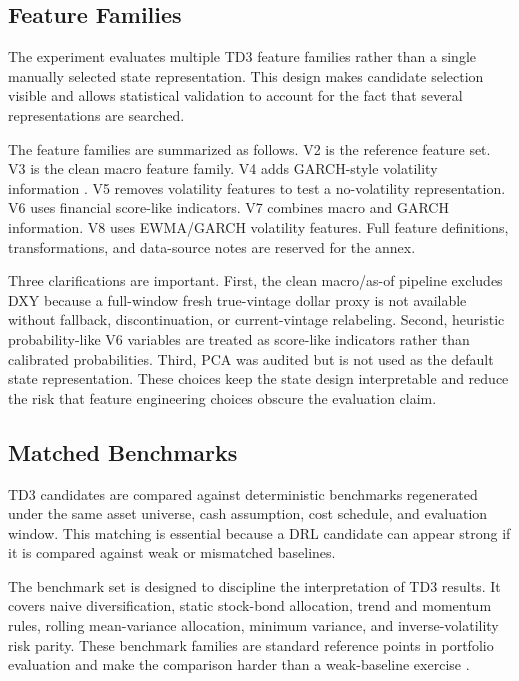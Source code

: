 \documentclass[12pt]{article}
\begin{document}
\subsection{Feature Families}

The experiment evaluates multiple TD3 feature families rather than a single manually selected state representation. This design makes candidate selection visible and allows statistical validation to account for the fact that several representations are searched.

The feature families are summarized as follows. V2 is the reference feature set. V3 is the clean macro feature family. V4 adds GARCH-style volatility information \citep{bollerslev1986}. V5 removes volatility features to test a no-volatility representation. V6 uses financial score-like indicators. V7 combines macro and GARCH information. V8 uses EWMA/GARCH volatility features. Full feature definitions, transformations, and data-source notes are reserved for the annex.

Three clarifications are important. First, the clean macro/as-of pipeline excludes DXY because a full-window fresh true-vintage dollar proxy is not available without fallback, discontinuation, or current-vintage relabeling. Second, heuristic probability-like V6 variables are treated as score-like indicators rather than calibrated probabilities. Third, PCA was audited but is not used as the default state representation. These choices keep the state design interpretable and reduce the risk that feature engineering choices obscure the evaluation claim.

\subsection{Matched Benchmarks}

TD3 candidates are compared against deterministic benchmarks regenerated under the same asset universe, cash assumption, cost schedule, and evaluation window. This matching is essential because a DRL candidate can appear strong if it is compared against weak or mismatched baselines.

The benchmark set is designed to discipline the interpretation of TD3 results. It covers naive diversification, static stock-bond allocation, trend and momentum rules, rolling mean-variance allocation, minimum variance, and inverse-volatility risk parity. These benchmark families are standard reference points in portfolio evaluation and make the comparison harder than a weak-baseline exercise \citep{markowitz1952,sharpe1966,demiguel2009,jagannathan2003,jegadeesh1993,moskowitz2012,maillard2010}.
\end{document}
